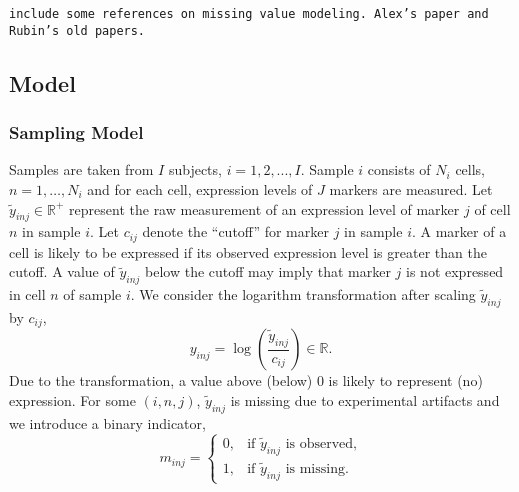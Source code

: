 \documentclass[12pt,]{article}
\providecommand{\tightlist}{%
  \setlength{\itemsep}{0pt}\setlength{\parskip}{0pt}}
\newcommand{\p}[1]{\left(#1\right)}
\begin{document}
{\tt include some references on missing value modeling. Alex's paper and
Rubin's old papers.}  



\subsection{Model}\label{prob-model}
\subsubsection{Sampling Model} 
Samples are taken from \(I\) subjects, \(i = 1,2,...,I\). Sample \(i\)
consists of \(N_i\) cells, \(n=1, \ldots, N_i\) and for each cell,
expression levels of \(J\) markers are measured. Let
\(\tilde{y}_{inj} \in \mathbb{R}^+\) represent the raw measurement of an
expression level of marker \(j\) of cell \(n\) in sample \(i\). Let
\(c_{ij}\) denote the ``cutoff'' for
 marker \(j\) in sample \(i\). A marker of a cell is likely to be expressed if its observed expression level is greater than the cutoff. A value of $\tilde{y}_{inj}$ below the cutoff may imply that marker $j$ is not expressed in cell $n$ of sample $i$.    We consider the logarithm transformation
after scaling \(\tilde{y}_{inj}\) by \(c_{ij}\), \[
y_{inj}=\log\p{\frac{\tilde{y}_{inj}}{c_{ij}}} \in \mathbb{R}.
\]
Due to the transformation, a value above (below) 0 is likely to represent (no) expression. For some \((i, n, j)\), \(\tilde{y}_{inj}\) is missing due to experimental artifacts and we
introduce a binary indicator, \[
m_{inj} = \begin{cases}
  0, & \text{if $\tilde{y}_{inj}$ is observed,} \\
  1, & \text{if $\tilde{y}_{inj}$ is missing.}
\end{cases}
\] %

\def\labelenumi{\arabic{enumi}.}
\end{document}
